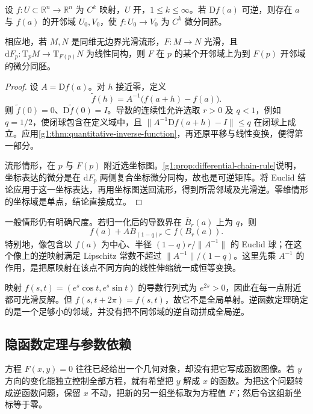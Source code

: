 \begin{theorem}[逆函数定理]
	\label{g1:thm:inverse-function}
	设 \(f:U\subset\mathbb R^n\to\mathbb R^n\) 为 \(C^k\) 映射，\(U\) 开，\(1\leq k\leq\infty\)。若 \(\mathrm{D}f(a)\) 可逆，则存在 \(a\) 与 \(f(a)\) 的开邻域 \(U_0,V_0\)，使 \(f:U_0\to V_0\) 为 \(C^k\) 微分同胚。
	
	相应地，若 \(M,N\) 是同维无边界光滑流形，\(F:M\to N\) 光滑，且 \(\mathrm{d}F_p:\mathrm{T}_pM\to \mathrm{T}_{F(p)}N\) 为线性同构，则 \(F\) 在 \(p\) 的某个开邻域上为到 \(F(p)\) 开邻域的微分同胚。
\end{theorem}
\begin{proof}
	设 \(A=\mathrm{D}f(a)\)。对 \(h\) 接近零，定义
	\[
		\widetilde f(h)=A^{-1}\bigl(f(a+h)-f(a)\bigr).
	\]
	则 \(\widetilde f(0)=0\)、\(\mathrm{D}\widetilde f(0)=I\)。导数的连续性允许选取 \(r>0\) 及 \(q<1\)，例如 \(q=1/2\)，使闭球包含在定义域中，且 \(\|A^{-1}\mathrm{D}f(a+h)-I\|\leq q\) 在闭球上成立。应用\cref{g1:thm:quantitative-inverse-function}，再还原平移与线性变换，便得第一部分。

	流形情形，在 \(p\) 与 \(F(p)\) 附近选坐标图。\cref{g1:prop:differential-chain-rule}说明，坐标表达的微分是在 \(\mathrm{d}F_p\) 两侧复合坐标微分同构，故也是可逆矩阵。将 Euclid 结论应用于这一坐标表达，再用坐标图送回流形，得到所需邻域及光滑逆。零维情形的坐标域是单点，结论直接成立。
\end{proof}

一般情形仍有明确尺度。若归一化后的导数界在 \(\overline B_r(a)\) 上为 \(q\)，则
\[
	f(a)+A B_{(1-q)r}\subset f(B_r(a)).
\]
特别地，像包含以 \(f(a)\) 为中心、半径 \((1-q)r/\|A^{-1}\|\) 的 Euclid 球；在这个像上的逆映射满足 Lipschitz 常数不超过 \(\|A^{-1}\|/(1-q)\)。这里先乘 \(A^{-1}\) 的作用，是把原映射在该点不同方向的线性伸缩统一成恒等变换。

\begin{example}
	\label{g1:exm:local-global-inverse}
	映射 \(f(s,t)=(e^s\cos t,e^s\sin t)\) 的导数行列式为 \(e^{2s}>0\)，因此在每一点附近都可光滑反解。但 \(f(s,t+2\pi)=f(s,t)\)，故它不是全局单射。逆函数定理确定的是一个足够小的邻域，并没有把不同邻域的逆自动拼成全局逆。
\end{example}

\subsection{隐函数定理与参数依赖}
\label{g1:subsec:1103:02}

方程 \(F(x,y)=0\) 往往已经给出一个几何对象，却没有把它写成函数图像。若 \(y\) 方向的变化能独立控制全部方程，就有希望把 \(y\) 解成 \(x\) 的函数。为把这个问题转成逆函数问题，保留 \(x\) 不动，把新的另一组坐标取为方程值 \(F\)；然后令这组新坐标等于零。

